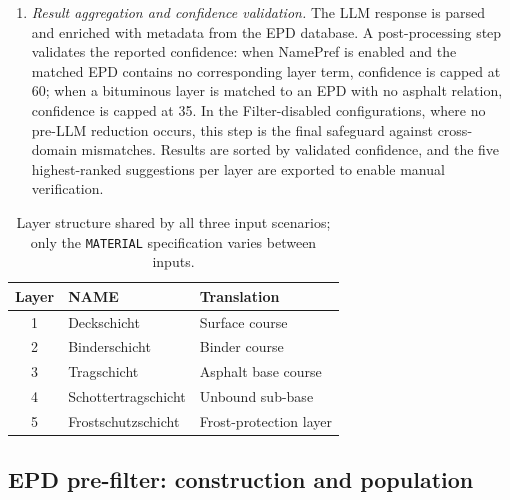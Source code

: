 \documentclass[10pt, a4paper, twocolumn]{article}
\begin{document}
\begin{enumerate}[leftmargin=*, itemsep=3pt, topsep=3pt, label=\arabic*.]
\item \textit{Result aggregation and confidence validation.} The LLM response is
parsed and enriched with metadata from the EPD database. A post-processing step
validates the reported confidence: when NamePref is enabled and the matched EPD
contains no corresponding layer term, confidence is capped at 60; when a bituminous
layer is matched to an EPD with no asphalt relation, confidence is capped at 35. In
the Filter-disabled configurations, where no pre-LLM reduction occurs, this step is
the final safeguard against cross-domain mismatches. Results are sorted by validated
confidence, and the five highest-ranked suggestions per layer are exported to enable
manual verification.

\end{enumerate}

\begin{table}[htbp]
  \caption{Layer structure shared by all three input scenarios; only the
           \texttt{MATERIAL} specification varies between inputs.}
  \label{tab:layers}
  \centering
  \small
  \begin{tabular}{cll}
    \toprule
    \textbf{Layer} & \textbf{NAME} & \textbf{Translation} \\
    \midrule
    1 & Deckschicht         & Surface course        \\
    2 & Binderschicht       & Binder course         \\
    3 & Tragschicht         & Asphalt base course   \\
    4 & Schottertragschicht & Unbound sub-base      \\
    5 & Frostschutzschicht  & Frost-protection layer\\
    \bottomrule
  \end{tabular}
\end{table}

\subsection{EPD pre-filter: construction and population}
\label{sec:filter}
\end{document}

